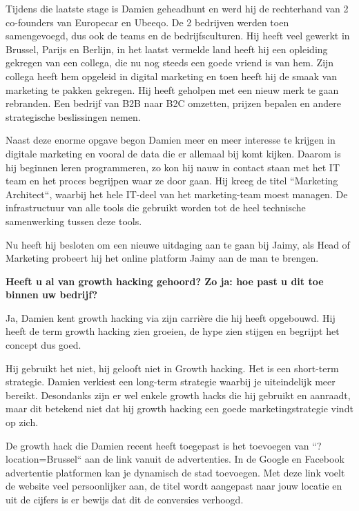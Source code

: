 Tijdens die laatste stage is Damien geheadhunt en werd hij de rechterhand van 2 co-founders van Europecar en Ubeeqo. De 2 bedrijven werden toen samengevoegd, dus ook de teams en de bedrijfsculturen. Hij heeft veel gewerkt in Brussel, Parijs en Berlijn, in het laatst vermelde land heeft hij een opleiding gekregen van een collega, die nu nog steeds een goede vriend is van hem. Zijn collega heeft hem opgeleid in digital marketing en toen heeft hij de smaak van marketing te pakken gekregen. Hij heeft geholpen met een nieuw merk te gaan rebranden. Een bedrijf van B2B naar B2C omzetten, prijzen bepalen en andere strategische beslissingen nemen.

Naast deze enorme opgave begon Damien meer en meer interesse te krijgen in digitale marketing en vooral de data die er allemaal bij komt kijken. Daarom is hij beginnen leren programmeren, zo kon hij nauw in contact staan met het IT team en het proces begrijpen waar ze door gaan. Hij kreeg de titel ``Marketing Architect``, waarbij het hele IT-deel van het marketing-team moest managen. De infrastructuur van alle tools die gebruikt worden tot de heel technische samenwerking tussen deze tools.

Nu heeft hij besloten om een nieuwe uitdaging aan te gaan bij Jaimy, als Head of Marketing probeert hij het online platform Jaimy aan de man te brengen.

\textbf{Heeft u al van growth hacking gehoord? Zo ja: hoe past u dit toe binnen uw bedrijf?}
	
Ja, Damien kent growth hacking via zijn carrière die hij heeft opgebouwd. Hij heeft de term growth hacking zien groeien, de hype zien stijgen en begrijpt het concept dus goed.

Hij gebruikt het niet, hij gelooft niet in Growth hacking. Het is een short-term strategie. Damien verkiest een long-term strategie waarbij je uiteindelijk meer bereikt. Desondanks zijn er wel enkele growth hacks die hij gebruikt en aanraadt, maar dit betekend niet dat hij growth hacking een goede marketingstrategie vindt op zich. 

De growth hack die Damien recent heeft toegepast is het toevoegen van ``?location=Brussel`` aan de link vanuit de advertenties. In de Google en Facebook advertentie platformen kan je dynamisch de stad toevoegen. Met deze link voelt de website veel persoonlijker aan, de titel wordt aangepast naar jouw locatie en uit de cijfers is er bewijs dat dit de conversies verhoogd.

